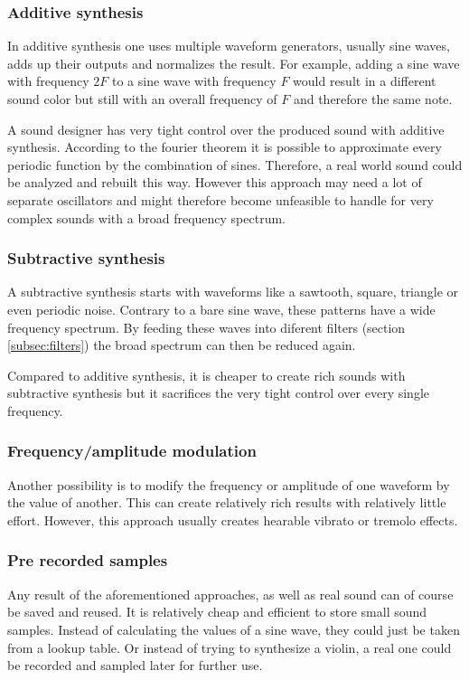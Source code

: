 			\subsubsection{Additive synthesis}
				In additive synthesis one uses multiple waveform generators, usually sine waves, adds up their outputs and normalizes the result.
				For example, adding a sine wave with frequency $2F$ to a sine wave with frequency $F$ would result in a different sound color but still with an overall frequency of $F$ and therefore the same note.
				
				A sound designer has very tight control over the produced sound with additive synthesis.
				According to the fourier theorem it is possible to approximate every periodic function by the combination of sines. 
				Therefore, a real world sound could be analyzed and rebuilt this way.
				However this approach may need a lot of separate oscillators and might therefore become unfeasible to handle for very complex sounds with a broad frequency spectrum.
			\subsubsection{Subtractive synthesis}
				A subtractive synthesis starts with waveforms like a sawtooth, square, triangle or even periodic noise.
				Contrary to a bare sine wave, these patterns have a wide frequency spectrum. 
				By feeding these waves into diferent filters (section \ref{subsec:filters}) the broad spectrum can then be reduced again. 
				
				Compared to additive synthesis, it is cheaper to create rich sounds with subtractive synthesis but it sacrifices the very tight control over every single frequency.
			\subsubsection{Frequency/amplitude modulation}
				Another possibility is to modify the frequency or amplitude of one waveform by the value of another.
				This can create relatively rich results with relatively little effort.
				However, this approach usually creates hearable vibrato or tremolo effects.
			\subsubsection{Pre recorded samples}
				Any result of the aforementioned approaches, as well as real sound can of course be saved and reused.
				It is relatively cheap and efficient to store small sound samples. 
				Instead of calculating the values of a sine wave, they could just be taken from a lookup table.
				Or instead of trying to synthesize a violin, a real one could be recorded and sampled later for further use.
				

